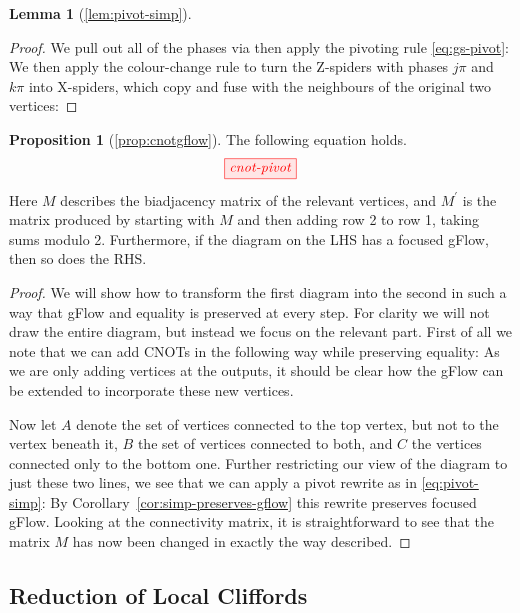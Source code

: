 \documentclass[a4paper,onecolumn,superscriptaddress,11pt,accepted=2020-04-27]{quantumarticle}
\theoremstyle{definition}
\newtheorem*{lemma*}{Lemma}
\newtheorem*{proposition*}{Proposition}
\begin{document}
\begin{lemma*}[\ref{lem:pivot-simp}]~
\end{lemma*}
\begin{proof}
   We pull out all of the phases via \SpiderRule then apply the pivoting rule \eqref{eq:gs-pivot}:
   We then apply the colour-change rule to turn the Z-spiders with phases $j\pi$ and $k\pi$ into X-spiders, which copy and fuse with the neighbours of the original two vertices:
\end{proof}

\begin{proposition*}[\ref{prop:cnotgflow}]
  The following equation holds.
  \begin{equation}
  \tikzfig{cnot-pivot} %
  \end{equation}
  Here $M$ describes the biadjacency matrix of the relevant vertices, and $M^\prime$ is the matrix produced by starting with $M$ and then adding row 2 to row 1, taking sums modulo 2. Furthermore, if the diagram on the LHS has a focused gFlow, then so does the RHS.
\end{proposition*}
\begin{proof}
  We will show how to transform the first diagram into the second in such a way that gFlow and equality is preserved at every step. For clarity we will not draw the entire diagram, but instead we focus on the relevant part. First of all we note that we can add CNOTs in the following way while preserving equality:
  As we are only adding vertices at the outputs, it should be clear how the gFlow can be extended to incorporate these new vertices.

  Now let $A$ denote the set of vertices connected to the top vertex, but not to the vertex beneath it, $B$ the set of vertices connected to both, and $C$ the vertices connected only to the bottom one. Further restricting our view of the diagram to just these two lines, we see that we can apply a pivot rewrite as in \eqref{eq:pivot-simp}:
  By Corollary~\ref{cor:simp-preserves-gflow} this rewrite preserves focused gFlow. Looking at the connectivity matrix, it is straightforward to see that the matrix $M$ has now been changed in exactly the way described.
\end{proof}

\subsection{Reduction of Local Cliffords}
\label{sec:reduction-lc}
\end{document}

